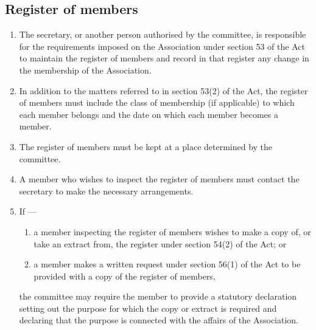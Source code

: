 \documentclass[../constitution.tex]{subfiles}
\begin{document}
\hypertarget{register-of-members}{%
\subsection{Register of members}\label{register-of-members}}

\begin{enumerate}

\item The secretary, or another person authorised by the committee, is responsible for the requirements imposed on the Association under section 53 of the Act to maintain the register of members and record in that register any change in the membership of the Association.
\item In addition to the matters referred to in section 53(2) of the Act, the register of members must include the class of membership (if applicable) to which each member belongs and the date on which each member becomes a member.
\item The register of members must be kept at a place determined by the committee.
\item A member who wishes to inspect the register of members must contact the secretary to make the necessary arrangements.
\item If ---

  \begin{enumerate}
  \item a member inspecting the register of members wishes to make a copy of, or take an extract from, the register under section 54(2) of the Act; or
  \item a member makes a written request under section 56(1) of the Act to be provided with a copy of the register of members,

  \end{enumerate}
  the committee may require the member to provide a statutory declaration setting out the purpose for which the copy or extract is required and declaring that the purpose is connected with the affairs of the Association.
\end{enumerate}
\end{document}
